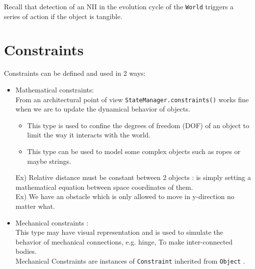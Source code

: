\documentclass[a4paper]{report}
\newcommand{\cm}[1]{{\color{red}#1}}
\newcommand{\ai}[1]{{\color{blue}#1}}
\newcommand{\eg}[1]{{\color{violet}#1}}
\begin{document}
Recall that detection of an NII in the evolution cycle of the \verb+World+ triggers a series of action if the object is tangible.

\chapter{Constraints}
Constraints can be defined and used in 2 ways:
\begin{itemize}
	\item Mathematical constraints: \\
	From an architectural point of view \verb+StateManager.constraints()+ works fine when we are to update the dynamical behavior of objects.
	\begin{itemize}
		\item 	This type is used to confine the degrees of 				freedom (DOF) of an object to limit the way it 						interacts with the world.
		\item This type can be used to model some complex 					objects such as ropes or maybe strings.
	\end{itemize}
	\eg{Ex) Relative distance must be constant between 2 objects : is simply setting a mathematical equation between space coordinates of them.}\\
	\eg{Ex) We have an obstacle which is only allowed to move in y-direction no matter what.}
	\item Mechanical constraints :\\
	
	This type may have visual representation and is used to simulate the behavior of mechanical connections, e.g. hinge, To make inter-connected bodies.\\
	\cm{Mechanical Constraints are instances of} \verb+Constraint+ \cm{inherited from} \verb+Object+ . \\
	
\end{itemize}




\end{document}
